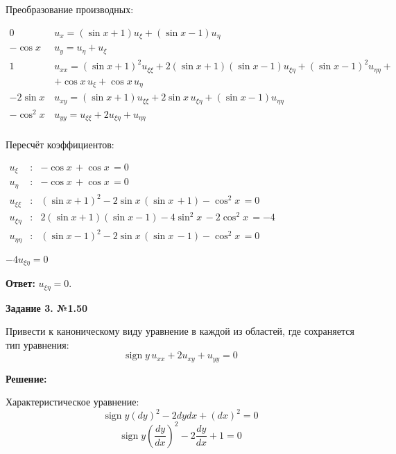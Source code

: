 \documentclass[a4paper,12pt]{article}
\begin{document}
Преобразование производных:
\begin{flushleft}
\(
\begin{array}{r|l}
0 & u_x = (\sin x + 1)u_{\xi} + (\sin x - 1)u_{\eta} \\
- \cos x \, & u_y = u_{\eta} + u_{\xi} \\
1 & u_{xx} = (\sin x + 1)^2u_{\xi\xi} + 2(\sin x + 1)(\sin x - 1)u_{\xi\eta} + (\sin x - 1)^2u_{\eta\eta} + \\ & + \cos x \,u_{\xi} + \cos x \,u_{\eta}\\
- 2 \sin x \, & u_{xy} = (\sin x + 1) u_{\xi\xi} + 2 \sin x \, u_{\xi\eta} + (\sin x - 1) u_{\eta\eta} \\
- \cos^2 x \, & u_{yy} = u_{\xi\xi} + 2u_{\xi\eta} + u_{\eta\eta} \\
\end{array}
\)
\end{flushleft}

Пересчёт коэффициентов:
\begin{flushleft}
\(
\begin{array}{rcl}
u_{\xi} & : & -\cos x \, + \cos x \, = 0\\
u_{\eta} & : & -\cos x \, + \cos x \, = 0 \\
u_{\xi\xi} & : & (\sin x + 1)^2 - 2 \sin x \, (\sin x \, + 1) - \cos^2 x \, = 0 \\
u_{\xi\eta} & : & 2(\sin x + 1)(\sin x - 1) - 4 \sin^2 x \, - 2 \cos^2 x \,  = -4\\
u_{\eta\eta} & : &  (\sin x - 1)^2 - 2 \sin x \, (\sin x \, - 1) - \cos^2 x \, = 0
\end{array}
\)
\end{flushleft}

$-4 u_{\xi\eta} = 0$

\vspace{2mm}
\textbf{Ответ:} $ u_{\xi\eta} = 0. $

\vspace{14mm}
\begin{center}    
\noindent \textbf{Задание 3. №1.50}
\end{center}

Привести к каноническому виду уравнение в каждой из областей, где сохраняется тип уравнения:
\begin{equation*}
    \operatorname{sign} y \, u_{xx} + 2 u_{xy} + u_{yy} = 0
\end{equation*}

\textbf{Решение:}

Характеристическое уравнение:
\begin{equation*}
    \operatorname{sign} y (dy)^2 - 2 dy dx + (dx)^2 = 0
\end{equation*}
\begin{equation*}
    \operatorname{sign} y \left( \frac{dy}{dx} \right)^2 - 2 \frac{dy}{dx} + 1 = 0
\end{equation*}
\end{document}
